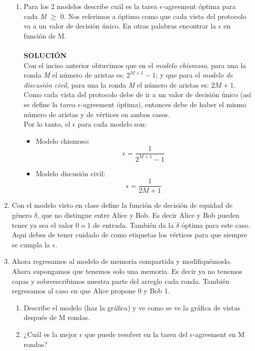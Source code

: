 \documentclass{article}
\begin{document}
\begin{enumerate}
{\begin{enumerate}
      \item{Para los 2 modelos describe cuál es la tarea $\epsilon$-agreement
        óptima para cada \textit{M} $≥$ 0. Nos referimos a óptimo como que cada
        vista del protocolo va a un valor de decisión único. En otras palabras
        encontrar la $\epsilon$ en función de M.}\\\\

        \textbf{SOLUCIÓN}\\
        Con el inciso anterior obtuvimos que en el \textit{modelo chismoso}, para una 
        la ronda \textit{M} el número de aristas es: $2^{M + 1}-1$; y que para el \textit{modelo
        de discusión civil}, para una la ronda \textit{M} el número de aristas es: $2M + 1$.
        Como cada vista del protocolo debe de ir a un valor de decisión único (así se define la tarea
        $\epsilon$-agreement óptima), entonces debe de haber el mismo número de aristas y de vértices
        en ambos casos.\\
        Por lo tanto, el $\epsilon$ para cada modelo son:
        \begin{itemize}
            \item {
                Modelo chismoso: \begin{equation} \epsilon = \frac{1}{2^{M + 1}-1} \end{equation}
            }
            \item {
                Modelo discusión civil: \begin{equation} \epsilon = \frac{1}{2M + 1} \end{equation}
            }
        \end{itemize}
    \end{enumerate}
  }

\item{
    Con el modelo visto en clase define la función de decisión de equidad de género
    $\delta$, que no distingue entre Alice y Bob. Es decir Alice y Bob pueden tener
    ya sea el valor 0 o 1 de entrada. También da la $\delta$ óptima para este caso.
    Aqui debes de tener cuidado de como etiquetas los vértices para que siempre
    se cumpla la $\epsilon$.
  }

\item{
    
    Ahora regresamos al modelo de memoria compartida y modifiquémoslo. Ahora 
    supongamos que tenemos solo una memoria. Es decir ya no tenemos capas y
    sobreescribimos nuestra parte del arreglo cada ronda. También regresamos
    al caso en que Alice propone 0 y Bob 1.
    \begin{enumerate}
      
    \item{Describe el modelo (haz la gráfica) y ve como se ve la gráfica de 
        vistas después de M rondas.
      }

    \item{¿Cuál es la mejor $\epsilon$ que puede resolver en la tarea del 
        $\epsilon$-agreement en M rondas?}
    \end{enumerate}
  }

\end{enumerate}
\end{document}

